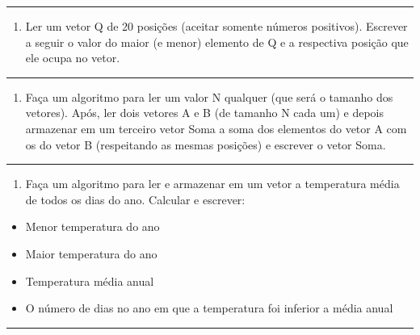 \documentclass[12pt,a4paper]{article}
\renewcommand{\linethickness}{0.05em}
\providecommand{\tightlist}{%
      \setlength{\itemsep}{0pt}\setlength{\parskip}{0pt}}
\begin{document}
    \begin{center}\rule{0.5\linewidth}{\linethickness}\end{center}

\begin{enumerate}
\def\labelenumi{\arabic{enumi}.}
\setcounter{enumi}{6}
\tightlist
\item
  Ler um vetor Q de 20 posições (aceitar somente números positivos).
  Escrever a seguir o valor do maior (e menor) elemento de Q e a
  respectiva posição que ele ocupa no vetor.
\end{enumerate}

    \begin{center}\rule{0.5\linewidth}{\linethickness}\end{center}

\begin{enumerate}
\def\labelenumi{\arabic{enumi}.}
\setcounter{enumi}{7}
\tightlist
\item
  Faça um algoritmo para ler um valor N qualquer (que será o tamanho dos
  vetores). Após, ler dois vetores A e B (de tamanho N cada um) e depois
  armazenar em um terceiro vetor Soma a soma dos elementos do vetor A
  com os do vetor B (respeitando as mesmas posições) e escrever o vetor
  Soma.
\end{enumerate}

    \begin{center}\rule{0.5\linewidth}{\linethickness}\end{center}

\begin{enumerate}
\def\labelenumi{\arabic{enumi}.}
\setcounter{enumi}{8}
\tightlist
\item
  Faça um algoritmo para ler e armazenar em um vetor a temperatura média
  de todos os dias do ano. Calcular e escrever:
\end{enumerate}

\begin{itemize}
\tightlist
\item
  Menor temperatura do ano
\item
  Maior temperatura do ano
\item
  Temperatura média anual
\item
  O número de dias no ano em que a temperatura foi inferior a média
  anual
\end{itemize}

    \begin{center}\rule{0.5\linewidth}{\linethickness}\end{center}
\end{document}
